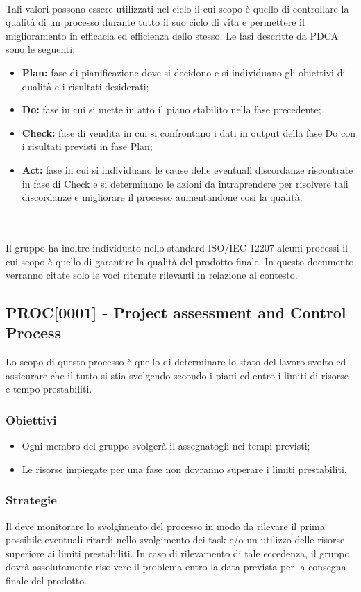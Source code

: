 \\
Tali valori possono essere utilizzati nel ciclo  il cui scopo è quello di controllare la qualità di un processo durante tutto il suo ciclo di vita e permettere il miglioramento in efficacia ed efficienza dello stesso. Le fasi descritte da PDCA sono le seguenti:
\begin{itemize}
    \item \textbf{Plan:} fase di pianificazione dove si decidono e si individuano gli obiettivi di qualità e i risultati desiderati;
    \item \textbf{Do:} fase in cui si mette in atto il piano stabilito nella fase precedente;
    \item \textbf{Check:} fase di vendita in cui si confrontano i dati in output della fase Do con i risultati previsti in fase Plan;
    \item \textbf{Act:} fase in cui si individuano le cause delle eventuali discordanze riscontrate in fase di Check e si determinano le azioni da intraprendere per risolvere tali discordanze e migliorare il processo aumentandone cosi la qualità.
\end{itemize}
\\\\
Il gruppo ha inoltre individuato nello standard ISO/IEC 12207 alcuni processi il cui scopo è quello di garantire la qualità del prodotto finale. In questo documento verranno citate solo le voci ritenute rilevanti in relazione al contesto.

\subsection{PROC[0001] - Project assessment and Control Process}
Lo scopo di questo processo è quello di determinare lo stato del lavoro svolto ed assicurare che il tutto si stia svolgendo secondo i piani ed entro i limiti di risorse e tempo prestabiliti.
\subsubsection{Obiettivi}
\begin{itemize}
    \item Ogni membro del gruppo svolgerà il  assegnatogli nei tempi previsti;
    \item Le risorse impiegate per una fase non dovranno superare i limiti prestabiliti.
\end{itemize}

\subsubsection{Strategie} 
Il  deve monitorare lo svolgimento del processo in modo da rilevare il prima possibile eventuali ritardi nello svolgimento dei task e/o un utilizzo delle risorse superiore ai limiti prestabiliti. In caso di rilevamento di tale eccedenza, il gruppo dovrà assolutamente risolvere il problema entro la data prevista per la consegna finale del prodotto.

